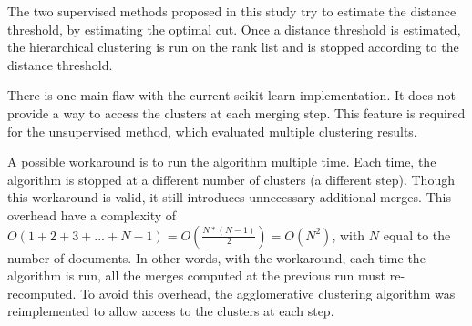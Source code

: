 The two supervised methods proposed in this study try to estimate the distance threshold, by estimating the optimal cut.
Once a distance threshold is estimated, the hierarchical clustering is run on the rank list and is stopped according to the distance threshold.

There is one main flaw with the current scikit-learn implementation.
It does not provide a way to access the clusters at each merging step.
This feature is required for the unsupervised method, which evaluated multiple clustering results.

A possible workaround is to run the algorithm multiple time.
Each time, the algorithm is stopped at a different number of clusters (a different step).
Though this workaround is valid, it still introduces unnecessary additional merges.
This overhead have a complexity of $O(1 + 2 + 3 + ... + N - 1) = O(\frac{N * (N - 1)}{2}) = O(N^2)$, with $N$ equal to the number of documents.
In other words, with the workaround, each time the algorithm is run, all the merges computed at the previous run must re-recomputed.
To avoid this overhead, the agglomerative clustering algorithm was reimplemented to allow access to the clusters at each step.

